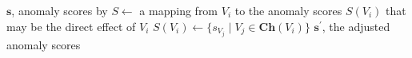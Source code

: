 \begin{algorithm}[tb]
	\caption{Descendant Adjustment}\label{alg:descendant-adjaustment}
	\begin{algorithmic}[1]
		\REQUIRE $\mathbf{s}$, anomaly scores by 
		\STATE $S \gets$ a mapping from $V_{i}$ to the anomaly scores $S(V_{i})$ that may be the direct effect of $V_{i}$
			\STATE $S(V_{i}) \gets \{s_{V_{j}} \mid V_{j} \in \mathbf{Ch}(V_{i})\}$\label{line:children:adjustment}
					\label{line:children:propagate}
				\ENDIF
			\ENDFOR
		\ENDFOR
				\label{line:children:aggregate}
			\ENDIF
		\ENDFOR
		\RETURN $\mathbf{s}^{\prime}$, the adjusted anomaly scores
	\end{algorithmic}
\end{algorithm}
